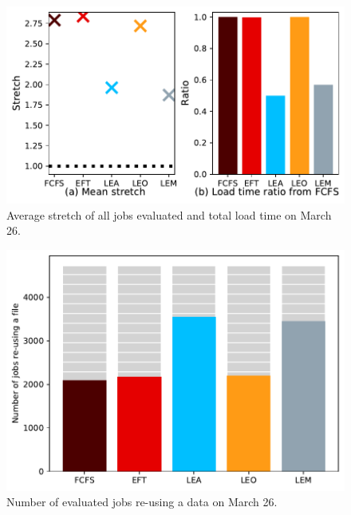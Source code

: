 \documentclass[conference,10pt]{IEEEtran}
\begin{document}
\begin{figure}[t]\centering\includegraphics[width=0.9\linewidth]{../MBSS/plot/Results_FCFS_Score_Backfill_2022-03-26->2022-03-26_V10000_Mean_Stretch_Total_waiting_for_a_load_time_and_transfer_time_450_128_32_256_4_1024.pdf}\caption{Average stretch of all jobs evaluated and total load time on March 26.}
\label{stretch.03-26}\end{figure}
\begin{figure}[t]\centering\includegraphics[width=0.9\linewidth]{../MBSS/plot/Results_FCFS_Score_Backfill_2022-03-26->2022-03-26_V10000_Number_of_data_reuse_450_128_32_256_4_1024.pdf}\caption{Number of evaluated jobs re-using a data on March 26.}\label{reuse.03-26}\end{figure}
\end{document}
